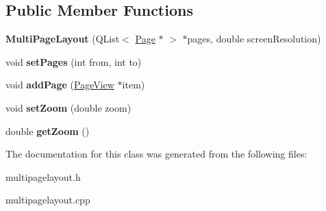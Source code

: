 \subsection*{Public Member Functions}
\begin{DoxyCompactItemize}
\item 
\hypertarget{class_multi_page_layout_a76fdd1abb31754c26b126765d5858a53}{
{\bfseries MultiPageLayout} (QList$<$ \hyperlink{class_page}{Page} $\ast$ $>$ $\ast$pages, double screenResolution)}
\label{class_multi_page_layout_a76fdd1abb31754c26b126765d5858a53}

\item 
\hypertarget{class_multi_page_layout_a001cb31955fedf40df40733cb5ad3b7a}{
void {\bfseries setPages} (int from, int to)}
\label{class_multi_page_layout_a001cb31955fedf40df40733cb5ad3b7a}

\item 
\hypertarget{class_multi_page_layout_a07620e14179f5fffbda27ce7ddfc9716}{
void {\bfseries addPage} (\hyperlink{class_page_view}{PageView} $\ast$item)}
\label{class_multi_page_layout_a07620e14179f5fffbda27ce7ddfc9716}

\item 
\hypertarget{class_multi_page_layout_a118d0fc51f81560a27a522278eecf765}{
void {\bfseries setZoom} (double zoom)}
\label{class_multi_page_layout_a118d0fc51f81560a27a522278eecf765}

\item 
\hypertarget{class_multi_page_layout_ab9dbbe12b509e8475b595531198d199c}{
double {\bfseries getZoom} ()}
\label{class_multi_page_layout_ab9dbbe12b509e8475b595531198d199c}

\end{DoxyCompactItemize}


The documentation for this class was generated from the following files:\begin{DoxyCompactItemize}
\item 
multipagelayout.h\item 
multipagelayout.cpp\end{DoxyCompactItemize}
